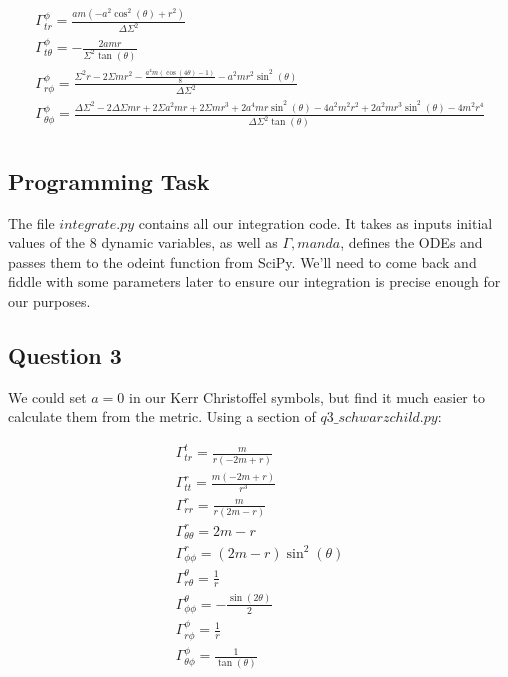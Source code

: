 \documentclass[10pt,a4paper]{report}
\begin{document}
\begin{align*}
\Gamma^\phi_{tr} = \frac{a m \left(- a^{2} \cos^{2}{\left(\theta \right)} + r^{2}\right)}{\Delta \Sigma^{2}}\\
\Gamma^\phi_{t\theta} = - \frac{2 a m r}{\Sigma^{2} \tan{\left(\theta \right)}}\\
\Gamma^\phi_{r\phi} = \frac{\Sigma^{2} r - 2 \Sigma m r^{2} - \frac{a^{4} m \left(\cos{\left(4 \theta \right)} - 1\right)}{8} - a^{2} m r^{2} \sin^{2}{\left(\theta \right)}}{\Delta \Sigma^{2}}\\
\Gamma^\phi_{\theta\phi} = \frac{\Delta \Sigma^{2} - 2 \Delta \Sigma m r + 2 \Sigma a^{2} m r + 2 \Sigma m r^{3} + 2 a^{4} m r \sin^{2}{\left(\theta \right)} - 4 a^{2} m^{2} r^{2} + 2 a^{2} m r^{3} \sin^{2}{\left(\theta \right)} - 4 m^{2} r^{4}}{\Delta \Sigma^{2} \tan{\left(\theta \right)}}\\
\end{align*}

\normalsize

\subsection*{Programming Task}

The file $integrate.py$ contains all our integration code. It takes as inputs initial values of the 8 dynamic variables, as well as $\Gamma, m and a$, defines the ODEs and passes them to the odeint function from SciPy. We'll need to come back and fiddle with some parameters later to ensure our integration is precise enough for our purposes. 
 
\subsection*{Question 3}

We could set $a=0$ in our Kerr Christoffel symbols, but find it much easier to calculate them from the metric. Using a section of $q3\_schwarzchild.py$:

\small\begin{align*}
\Gamma^t_{tr} = \frac{m}{r (- 2 m + r)}\\
\Gamma^r_{tt} = \frac{m (- 2 m + r)}{r^{3}}\\
\Gamma^r_{rr} = \frac{m}{r (2 m - r)}\\
\Gamma^r_{\theta\theta} = 2 m - r\\
\Gamma^r_{\phi\phi} = (2 m - r) \sin^{2}{(\theta )}\\
\Gamma^\theta_{r\theta} = \frac{1}{r}\\
\Gamma^\theta_{\phi\phi} = - \frac{\sin{(2 \theta )}}{2}\\
\Gamma^\phi_{r\phi} = \frac{1}{r}\\
\Gamma^\phi_{\theta\phi} = \frac{1}{\tan{(\theta )}}\\
\end{align*}
\end{document}
